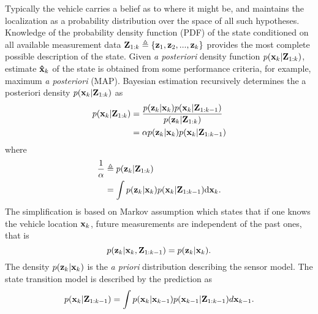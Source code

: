 Typically the vehicle carries a belief as to where it might be, and maintains the localization as a probability distribution over the space of all such hypotheses. Knowledge of the probability density function (PDF) of the state conditioned on all available measurement data ${\bf Z}_{1:k}\triangleq\{{\bf z}_1,{\bf z}_2,...,{\bf z}_k\}$ provides the most complete possible description of the state. Given \textit{a posteriori} density function $p({\bf x}_k|{\bf Z}_{1:k})$, estimate ${\bf \hat x}_k$ of the state is obtained from some performance criteria, for example, maximum \textit{a posteriori} (MAP). Bayesian estimation \cite{Aoki1967} recursively determines the a posteriori density $p({\bf x}_k|{\bf Z}_{1:k})$ as
\begin{align}
\begin{split}
p({\bf x}_k|{\bf Z}_{1:k})&=\frac{p({\bf z}_{k}|{\bf x}_k)p({\bf x}_k|{\bf Z}_{1:k-1})}{p({\bf z}_k|{\bf Z}_{1:k})} \\
&=\alpha p({\bf z}_{k}|{\bf x}_k)p({\bf x}_k|{\bf Z}_{1:k-1}) \\
\end{split}
\end{align}
where
\begin{align}
\begin{split}
\frac{1}{\alpha}&\triangleq p({\bf z}_k|{\bf Z}_{1:k}) \\
&=\int p({\bf z}_{k}|{\bf x}_k)p({\bf x}_k|{\bf Z}_{1:k-1})\mathrm{d}{\bf x}_{k}.
\end{split}
\end{align} %
The simplification is based on Markov assumption \cite{Alspach1972} which states that if one knows the vehicle location ${\bf x}_k$, future measurements are independent of the past ones, that is
\begin{equation}
    p({\bf z}_k|{\bf x}_k,{\bf Z}_{1:k-1})=p({\bf z}_k|{\bf x}_k).
\end{equation}
The density $p({\bf z}_{k}|{\bf x}_k)$ is the \textit{a priori} distribution describing the sensor model. The state transition model is described by the prediction as
\begin{equation}
p({\bf x}_k|{\bf Z}_{1:k-1})=\int p({\bf x}_{k}|{\bf x}_{k-1})p({\bf x}_{k-1}|{\bf Z}_{1:k-1})d{\bf x}_{k-1}.   
\end{equation}

